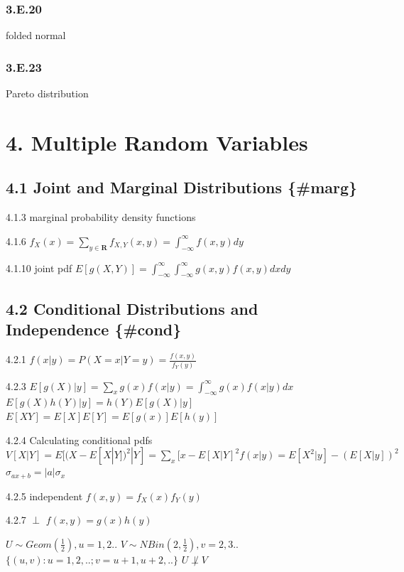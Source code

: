 \documentclass[10pt,twocolumn,portrait]{article}
\begin{document}
\hypertarget{e.20}{%
\subsubsection{3.E.20}\label{e.20}}

folded normal

\hypertarget{Pareto}{%
\subsubsection{3.E.23}\label{Pareto}}

Pareto distribution

\hypertarget{multiple-random-variables}{%
\section{4. Multiple Random Variables}\label{multiple-random-variables}}

\hypertarget{joint}{%
\subsection{4.1 Joint and Marginal Distributions
\{\#marg\}}\label{joint}}

4.1.3 marginal probability density functions

4.1.6
\(f_X(x)=\sum\limits_{y\in\mathbf{R}}f_{X,Y}(x,y)=\int_{-\infty}^{\infty}f(x,y)dy\)

4.1.10 joint pdf
\(E[g(X,Y)]=\int_{-\infty}^{\infty}\int_{-\infty}^{\infty} g(x,y)f(x,y)dxdy\)

\hypertarget{indep-1}{%
\subsection{4.2 Conditional Distributions and Independence
\{\#cond\}}\label{indep-1}}

4.2.1 \(f(x|y)=P(X=x|Y=y)=\frac{f(x,y)}{f_Y(y)}\)

4.2.3
\(E[g(X)|y]=\sum\limits_xg(x)f(x|y)=\int_{-\infty}^{\infty}g(x)f(x|y)dx\)
\(E[g(X)h(Y)|y]=h(Y)E[g(X)|y]\) \(E[XY]=E[X]E[Y]=E[g(x)]E[h(y)]\)

4.2.4 Calculating conditional pdfs
\(V[X|Y]=E[(X-E[X|Y])^2|Y]=\sum\limits_x [x-E[X|Y]^2 f(x|y)=E[X^2|y]-(E[X|y])^2\)
\(\sigma_{ax+b} =|a|\sigma_{x}\)

4.2.5 independent \(f(x,y)=f_X(x)f_Y(y)\)

4.2.7 \(\perp\) \(f(x,y)=g(x)h(y)\)

\(U\sim Geom(\frac12),u=1,2..\) \(V\sim NBin(2,\frac12),v=2,3..\)
\(\{(u,v):u=1,2,..;v=u+1,u+2,..\}\) \(U\not\perp V\)
\end{document}

